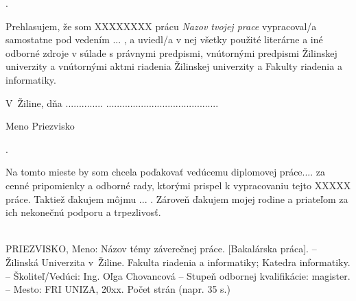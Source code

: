 \pagestyle{plain}
\setcounter{page}{3}

\newpage
\phantom.
\vspace{12cm}

\vspace{2em}

Prehlasujem, že som XXXXXXXX prácu \textit{Nazov tvojej prace} vypracoval/a samostatne pod vedením ... , a uviedl/a v nej všetky použité literárne a iné odborné zdroje v súlade s právnymi predpismi, vnútornými predpismi Žilinskej univerzity a vnútornými aktmi riadenia Žilinskej univerzity a Fakulty riadenia a informatiky.

\vspace{2em}

\noindent
V~Žiline, dňa ..............
\hfill
..........................................


\hfill
Meno Priezvisko \qquad\quad
\clearpage

\newpage
\phantom.
\vspace{12cm}
\vspace{2em}
\noindent
\bigskip

Na tomto mieste by som chcela poďakovať vedúcemu diplomovej práce....  za cenné pripomienky a odborné rady, ktorými prispel k vypracovaniu tejto XXXXX práce. Taktiež ďakujem môjmu ... . Zároveň ďakujem mojej rodine a priateľom za ich nekonečnú podporu a trpezlivosť.

\vspace{2em}
\clearpage


\\

\noindent
PRIEZVISKO, Meno: Názov témy záverečnej práce. [Bakalárska práca]. – Žilinská Univerzita v~Žiline. Fakulta riadenia a informatiky; Katedra informatiky. – Školiteľ/Vedúci: Ing. Oľga Chovancová –   Stupeň odbornej kvalifikácie: magister. – Mesto: FRI UNIZA, 20xx. Počet strán (napr. 35 s.)

